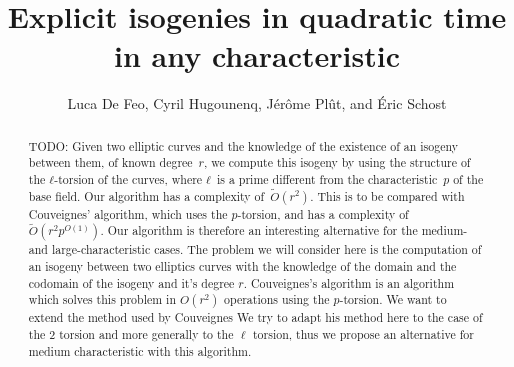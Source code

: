 \documentclass{lms}
\title[Explicit isogenies in any characteristic]{Explicit isogenies in quadratic time in any characteristic}
\author{Luca De Feo, Cyril Hugounenq, Jérôme Plût, and Éric Schost}
\newcommand{\todo}[1]{{\color{red}TODO: #1}}
\newcommand{\tildO}{\tilde{O}}
\begin{document}
\maketitle

\begin{abstract}
\todo{
Given two elliptic curves and the knowledge of the existence of
an isogeny between them, of known degree~$r$,
we compute this isogeny by using
the structure of the $ℓ$-torsion of the curves,
where $ℓ$~is a prime different from the characteristic~$p$ of the base field.
Our algorithm has a complexity of~$\tildO(r^2)$.
This is to be compared with Couveignes' algorithm,
which uses the $p$-torsion, and has a complexity of~$\tildO(r^2 p^{O(1)})$.
Our algorithm is therefore an interesting alternative
for the medium- and large-characteristic cases.
}
The problem we will consider here is the computation of an isogeny between two elliptics curves with the knowledge of the domain and the codomain of the isogeny and it's degree $r$. Couveignes's algorithm is an algorithm which solves this problem in $O(r^2)$ operations using the $p$-torsion. We want to extend the method used by Couveignes  We try to adapt his method here to the case of the $2$ torsion and more generally to the $\ell$ torsion, thus we propose an alternative for medium characteristic with this algorithm.
\end{abstract}



\end{document}
